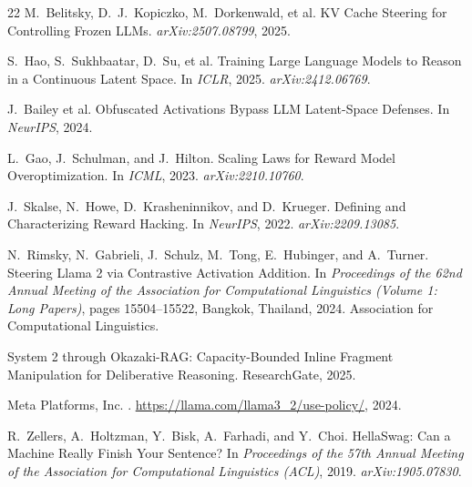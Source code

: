 \documentclass{article}
\begin{document}
\begin{thebibliography}{22}
M.~Belitsky, D.~J.~Kopiczko, M.~Dorkenwald, et al.
\newblock KV Cache Steering for Controlling Frozen LLMs.
\newblock \emph{arXiv:2507.08799}, 2025.

S.~Hao, S.~Sukhbaatar, D.~Su, et al.
\newblock Training Large Language Models to Reason in a Continuous Latent Space.
\newblock In \emph{ICLR}, 2025. \emph{arXiv:2412.06769}.


J.~Bailey et al.
\newblock Obfuscated Activations Bypass LLM Latent-Space Defenses.
\newblock In \emph{NeurIPS}, 2024.

L.~Gao, J.~Schulman, and J.~Hilton.
\newblock Scaling Laws for Reward Model Overoptimization.
\newblock In \emph{ICML}, 2023. \emph{arXiv:2210.10760}.

J.~Skalse, N.~Howe, D.~Krasheninnikov, and D.~Krueger.
\newblock Defining and Characterizing Reward Hacking.
\newblock In \emph{NeurIPS}, 2022. \emph{arXiv:2209.13085}.

N.~Rimsky, N.~Gabrieli, J.~Schulz, M.~Tong, E.~Hubinger, and A.~Turner.
\newblock Steering {L}lama 2 via Contrastive Activation Addition.
\newblock In \emph{Proceedings of the 62nd Annual Meeting of the Association for Computational Linguistics (Volume 1: Long Papers)}, pages 15504--15522, Bangkok, Thailand, 2024. Association for Computational Linguistics.

System 2 through Okazaki-RAG: Capacity-Bounded Inline Fragment Manipulation for Deliberative Reasoning.
\newblock ResearchGate, 2025.

Meta Platforms, Inc.
.
\newblock \url{https://llama.com/llama3_2/use-policy/}, 2024.

R.~Zellers, A.~Holtzman, Y.~Bisk, A.~Farhadi, and Y.~Choi.
\newblock HellaSwag: Can a Machine Really Finish Your Sentence?
\newblock In \emph{Proceedings of the 57th Annual Meeting of the Association for Computational Linguistics (ACL)}, 2019. \emph{arXiv:1905.07830}.

\end{thebibliography}
\end{document}
